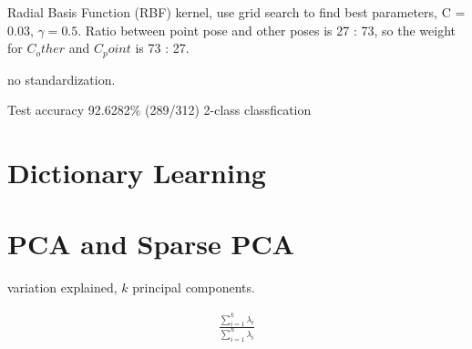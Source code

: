 Radial Basis Function (RBF) kernel, use grid search to find best parameters, C =
0.03, $\gamma = 0.5$. Ratio between point pose and other poses is 27 : 73, so
the weight for $C_other$ and $C_point$ is 73 : 27. 

no standardization.

Test accuracy 92.6282\% (289/312) 2-class classfication


\section{Dictionary Learning}

\section{PCA and Sparse PCA}
variation explained, $k$ principal components.

\begin{align}
\frac{\sum_{i=1}^{k} \lambda_i}{\sum_{i=1}^{n}\lambda_i}
\end{align}